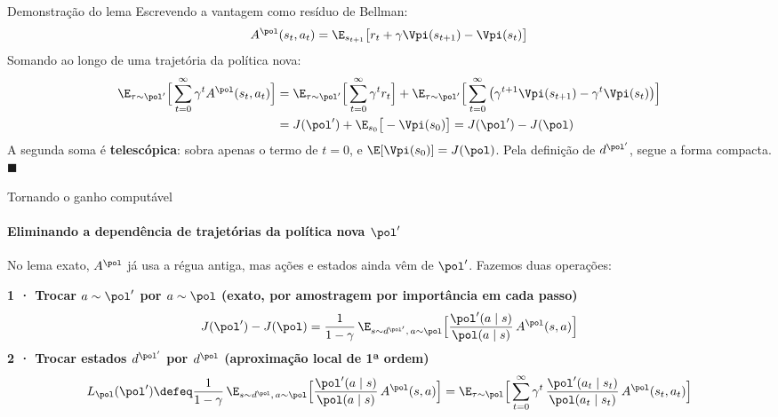 \documentclass[aspectratio=169, 11pt]{beamer}
\newcommand{\azul}[1]{{\color{rlAzulClaro}#1}}
\begin{document}
\begin{frame}{Demonstração do lema}
  Escrevendo a vantagem como resíduo de Bellman:
  \[
    A^{\pol}(s_t,a_t) = \E_{s_{t+1}}\big[r_t + \gamma\Vpi(s_{t+1}) - \Vpi(s_t)\big]
  \]
  Somando ao longo de uma trajetória da política nova:
  \begin{align*}
    \E_{\tau\sim\pol'}\Big[\sum_{t=0}^{\infty}\gamma^t A^{\pol}(s_t,a_t)\Big]
      &= \E_{\tau\sim\pol'}\Big[\sum_{t=0}^{\infty}\gamma^t r_t\Big]
       + \E_{\tau\sim\pol'}\Big[\sum_{t=0}^{\infty}\big(\gamma^{t+1}\Vpi(s_{t+1}) - \gamma^t\Vpi(s_t)\big)\Big]\\
      &= J(\pol') + \E_{s_0}\big[-\Vpi(s_0)\big] = J(\pol') - J(\pol)
  \end{align*}
  A segunda soma é \textbf{telescópica}: sobra apenas o termo de $t=0$, e
  $\E[\Vpi(s_0)] = J(\pol)$. Pela definição de $d^{\pol'}$, segue a forma compacta. $\blacksquare$
\end{frame}

\begin{frame}{Tornando o ganho computável}
  \framesubtitle{Eliminando a dependência de trajetórias da política nova $\pol'$}

  No lema exato, $A^{\pol}$ já usa a régua antiga, mas ações e estados ainda vêm de $\pol'$.
  Fazemos duas operações:

  \medskip
  {\small\bfseries\azul{1 · Trocar $a\sim\pol'$ por $a\sim\pol$} (exato, por amostragem por importância em cada passo)}
  \[
    J(\pol') - J(\pol) = \frac{1}{1-\gamma}\,\E_{s\sim d^{\pol'},\,a\sim\pol}\Big[\frac{\pol'(a\mid s)}{\pol(a\mid s)}\,A^{\pol}(s,a)\Big]
  \]
  {\small\bfseries{\color{rlLaranja}2 · Trocar estados $d^{\pol'}$ por $d^{\pol}$} (aproximação local de 1ª ordem)}
  \[
    L_{\pol}(\pol') \defeq \frac{1}{1-\gamma}\,\E_{s\sim d^{\pol},\,a\sim\pol}\Big[\frac{\pol'(a\mid s)}{\pol(a\mid s)}\,A^{\pol}(s,a)\Big]
      = \E_{\tau\sim\pol}\Big[\sum_{t=0}^{\infty}\gamma^t\,\frac{\pol'(a_t\mid s_t)}{\pol(a_t\mid s_t)}\,A^{\pol}(s_t,a_t)\Big]
  \]
\end{frame}
\end{document}

